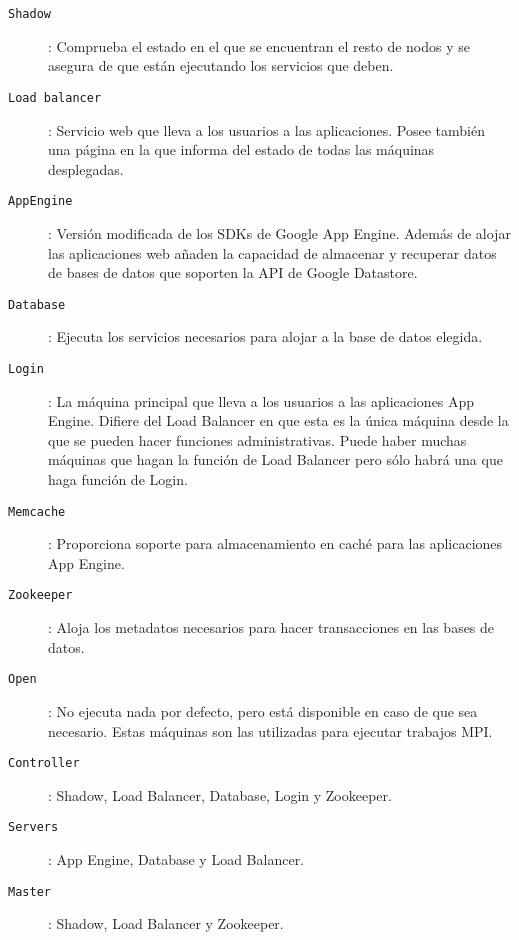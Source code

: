 \begin{description}
\item[\texttt{Shadow}]: Comprueba el estado en el que se encuentran el resto de nodos y se asegura de que están ejecutando los servicios que deben.
\item[\texttt{Load balancer}]: Servicio web que lleva a los usuarios a las aplicaciones. Posee también una página en la que informa del estado de todas las máquinas desplegadas.
\item[\texttt{AppEngine}]: Versión modificada de los SDKs de Google App Engine. Además de alojar las aplicaciones web añaden la capacidad de almacenar y recuperar datos de bases de datos que soporten la API de Google Datastore.
\item[\texttt{Database}]: Ejecuta los servicios necesarios para alojar a la base de datos elegida.
\item[\texttt{Login}]: La máquina principal que lleva a los usuarios a las aplicaciones App Engine. Difiere del Load Balancer en que esta es la única máquina desde la que se pueden hacer funciones administrativas. Puede haber muchas máquinas que hagan la función de Load Balancer pero sólo habrá una que haga función de Login.
\item[\texttt{Memcache}]: Proporciona soporte para almacenamiento en caché para las aplicaciones App Engine.
\item[\texttt{Zookeeper}]: Aloja los metadatos necesarios para hacer transacciones en las bases de datos.
\item[\texttt{Open}]: No ejecuta nada por defecto, pero está disponible en caso de que sea necesario. Estas máquinas son las utilizadas para ejecutar trabajos MPI.
\end{description}

\begin{description}
\item[\texttt{Controller}]: Shadow, Load Balancer, Database, Login y Zookeeper.
\item[\texttt{Servers}]: App Engine, Database y Load Balancer.
\item[\texttt{Master}]: Shadow, Load Balancer y Zookeeper.
\end{description}
